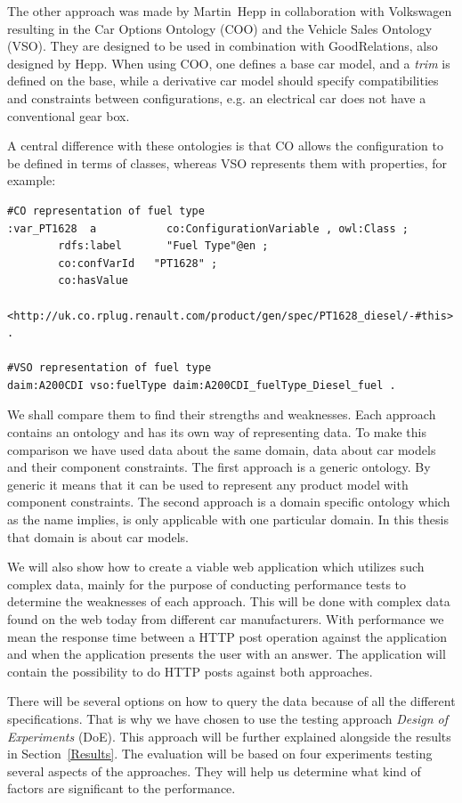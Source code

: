 \documentclass{llncs}
\begin{document}
The other approach was made by Martin~Hepp in collaboration with
Volkswagen resulting in the Car Options Ontology (COO) \cite{COO} and
the Vehicle Sales Ontology (VSO). They are designed to be used in
combination with GoodRelations, also designed by Hepp. When using COO,
one defines a base car model, and a \emph{trim} is defined on the
base, while a derivative car model should specify compatibilities and
constraints between configurations, e.g. an electrical car does not
have a conventional gear box.

A central difference with these ontologies is that CO allows the
configuration to be defined in terms of classes, whereas VSO
represents them with properties, for example:
\begin{lstlisting}[basicstyle=\tiny, frame=single]
#CO representation of fuel type
:var_PT1628  a           co:ConfigurationVariable , owl:Class ;
        rdfs:label       "Fuel Type"@en ;
        co:confVarId   "PT1628" ;
        co:hasValue    
	    <http://uk.co.rplug.renault.com/product/gen/spec/PT1628_diesel/-#this> .

#VSO representation of fuel type
daim:A200CDI vso:fuelType daim:A200CDI_fuelType_Diesel_fuel .
\end{lstlisting}



We shall compare them to find their strengths and
weaknesses. Each approach contains an ontology and has its own way of
representing data.  To make this comparison we have used data about
the same domain, data about car models and their component
constraints.  The first approach is a generic ontology. By generic it
means that it can be used to represent any product model with
component constraints. The second approach is a domain specific
ontology which as the name implies, is only applicable with one
particular domain. In this thesis that domain is about car models.

We will also show how to create a viable web application which
utilizes such complex data, mainly for the purpose of conducting
performance tests to determine the weaknesses of each approach. This
will be done with complex data found on the web today from different
car manufacturers.  With performance we mean the response time between
a HTTP post operation against the application and when
the application presents the user with an answer. The application will
contain the possibility to do HTTP posts against both approaches.

There will be several options on how to query the data because of all
the different specifications.  That is why we have chosen to use the
testing approach \emph{Design of Experiments} (DoE). This approach
will be further explained alongside the results in
Section~\ref{Results}. The evaluation will be based on four
experiments testing several aspects of the approaches. They will help
us determine what kind of factors are significant to the performance.
\end{document}

